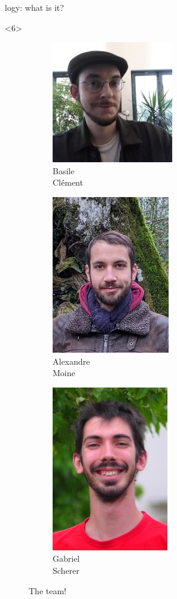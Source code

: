 \begin{frame}[fragile]{\Zoo[]logy: what is it?}
\begin{overbox}<6>
    \begin{figure}
        \begin{subfigure}{0.4\textwidth}
            \includegraphics[scale=0.4]{images/basile_clement.jpg}
            \caption*{\footnotesize Basile \\ Clément}
        \end{subfigure}
        \begin{subfigure}{0.3\textwidth}
            \includegraphics[scale=0.3]{images/alexandre_moine.jpg}
            \caption*{\footnotesize Alexandre \\ Moine}
        \end{subfigure}
        \begin{subfigure}{0.25\textwidth}
            \includegraphics[scale=1.2]{images/gabriel_scherer.jpg}
            \caption*{\footnotesize Gabriel \\ Scherer}
        \end{subfigure}
        \caption*{The \Pstore team!}
    \end{figure}
\end{overbox}


\end{frame}

